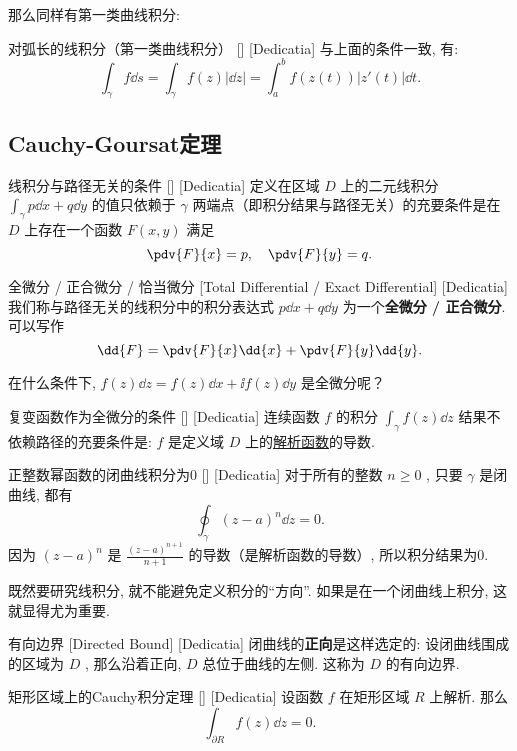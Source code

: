\documentclass[UTF8]{ctexart}
\newcommand{\AnalyticalFunction}{\hyperref[dfn:AnalyticalFunction]{解析函数}}
\begin{document}
那么同样有第一类曲线积分: 
\begin{ppt}
    [UUID]
    {对弧长的线积分（第一类曲线积分）}
    []
    [Dedicatia]
    与上面的条件一致, 有: 
    \[\int_\gamma f\dd{s}=\int_\gamma f(z)|\dd{z}|=\int_{a}^b f(z(t))|z'(t)|\dd{t}.\]
\end{ppt}
\subsection{Cauchy-Goursat定理}
\begin{thm}
    [UUID]
    {线积分与路径无关的条件}
    []
    [Dedicatia]
    定义在区域 \( D \) 上的二元线积分 \( \int_\gamma p\dd{x}+q\dd{y} \) 的值只依赖于 \( \gamma \) 两端点（即积分结果与路径无关）的充要条件是在 \( D \) 上存在一个函数 \( F(x,y) \) 满足
    \[\pdv{F}{x}=p,\quad\pdv{F}{y}=q.\]
\end{thm}
\begin{dfn}
    [ExactDifferential]
    {全微分 / 正合微分 / 恰当微分}
    [Total Differential / Exact Differential]
    [Dedicatia]
    我们称与路径无关的线积分中的积分表达式 \( p\dd{x}+q\dd{y} \) 为一个\textbf{全微分 / 正合微分}. 可以写作
    \[\dd{F}=\pdv{F}{x}\dd{x}+\pdv{F}{y}\dd{y}.\]
\end{dfn}
在什么条件下,  \( f(z)\dd{z}=f(z)\dd{x}+\ii f(z)\dd{y} \) 是全微分呢？
\begin{crl}
    [UUID]
    {复变函数作为全微分的条件}
    []
    [Dedicatia]
    连续函数 \( f \) 的积分 \( \int_\gamma f(z)\dd{z} \) 结果不依赖路径的充要条件是:  \( f \) 是定义域 \( D \) 上的\AnalyticalFunction 的导数. 
\end{crl}
\begin{xmp}
    [UUID]
    {正整数幂函数的闭曲线积分为0}
    []
    [Dedicatia]
    对于所有的整数 \( n\geqslant 0 \) , 只要 \( \gamma \) 是闭曲线, 都有
    \[\oint_\gamma (z-a)^n\dd{z}=0.\]
    因为 \( (z-a)^n \) 是 \( \frac{(z-a)^{n+1}}{n+1} \) 的导数（是解析函数的导数）, 所以积分结果为0. 
\end{xmp}
既然要研究线积分, 就不能避免定义积分的“方向”. 如果是在一个闭曲线上积分, 这就显得尤为重要. 
\begin{dfn}
    [UUID]
    {有向边界}
    [Directed Bound]
    [Dedicatia]
    闭曲线的\textbf{正向}是这样选定的: 设闭曲线围成的区域为 \( D \) , 那么沿着正向,  \( D \) 总位于曲线的左侧. 这称为 \( D \) 的有向边界. 
\end{dfn}
\begin{thm}
    [UUID]
    {矩形区域上的Cauchy积分定理}
    []
    [Dedicatia]
    设函数 \( f \) 在矩形区域 \( R \) 上解析. 那么
    \[\int_{\partial R}f(z)\dd{z}=0.\]
\end{thm}
\end{document}
